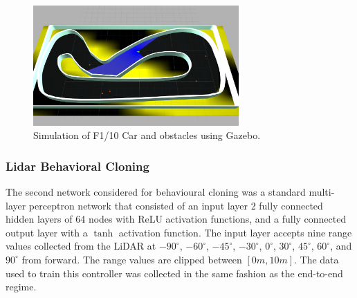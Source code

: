 \documentclass[manuscript,screen,review]{acmart}
\begin{document}
\begin{figure}[!htbp]
  \centering
    \includegraphics[width=0.7\textwidth]{figures/gazebo.jpg}
   \caption{Simulation of F1/10 Car and obstacles using Gazebo.}
  \label{fig:racetrack}
\end{figure}

\subsubsection{Lidar Behavioral Cloning}
\label{sec:lidar cloning}
The second network considered for behavioural cloning was a standard multi-layer perceptron network that consisted of an input layer 2 fully connected hidden layers of 64 nodes with ReLU activation functions, and a fully connected output layer with a $\tanh$ activation function. The input layer accepts nine range values collected from the LiDAR at $-90^{\circ}$, $-60^{\circ}$, $-45^{\circ}$, $-30^{\circ}$, $0^{\circ}$, $30^{\circ}$, $45^{\circ}$, $60^{\circ}$, and $90^{\circ}$ from forward. The range values are clipped between $[0m, 10m]$. The data used to train this controller was collected in the same fashion as the end-to-end regime. 



\end{document}
